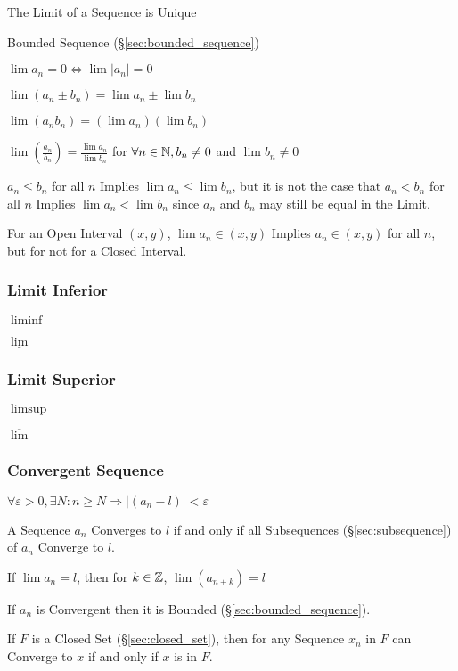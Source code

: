 The Limit of a Sequence is Unique

Bounded Sequence (\S\ref{sec:bounded_sequence})

$\lim a_n = 0 \Leftrightarrow \lim |a_n| = 0$

$\lim (a_n \pm b_n) = \lim a_n \pm \lim b_n$

$\lim (a_n b_n) = (\lim a_n) (\lim b_n)$

$\lim (\frac{a_n}{b_n}) = \frac{\lim a_n}{\lim b_n}$ for $\forall
n \in \mathbb{N}, b_n \neq 0$ and $\lim b_n \neq 0$

$a_n \leq b_n$ for all $n$ Implies $\lim a_n \leq \lim b_n$, but it is
not the case that $a_n < b_n$ for all $n$ Implies $\lim a_n < \lim
b_n$ since $a_n$ and $b_n$ may still be equal in the Limit.

For an Open Interval $(x,y)$, $\lim a_n \in (x,y)$ Implies $a_n \in
(x,y)$ for all $n$, but for not for a Closed Interval.



\subsubsection{Limit Inferior}\label{sec:liminf}

$\liminf$

$\underline{\lim}$



\subsubsection{Limit Superior}\label{sec:limsup}

$\limsup$

$\overline{\lim}$



\subsubsection{Convergent Sequence}\label{sec:convergent_sequence}

$\forall \varepsilon > 0, \exists N : n \geq N \Rightarrow |(a_n - l)| <
\varepsilon$

A Sequence $a_n$ Converges to $l$ if and only if all Subsequences
(\S\ref{sec:subsequence}) of $a_n$ Converge to $l$.

If $\lim a_n = l$, then for $k \in \mathbb{Z}$, $\lim (a_{n+k}) = l$

If $a_n$ is Convergent then it is Bounded
(\S\ref{sec:bounded_sequence}).

If $F$ is a Closed Set (\S\ref{sec:closed_set}), then for any Sequence
$x_n$ in $F$ can Converge to $x$ if and only if $x$ is in $F$.



